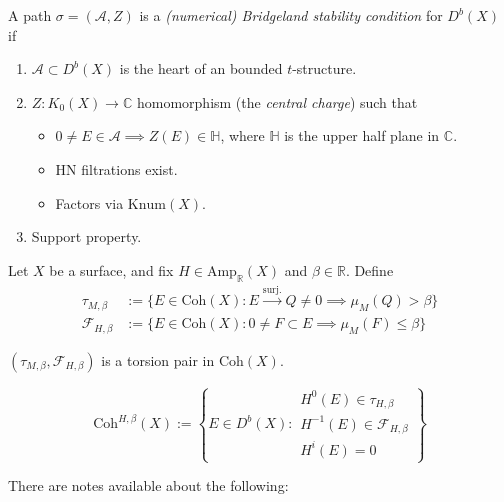 \begin{definition}
\label{definition-numerical-Bridgeland-stability-condition}
A path $\sigma=(\mathcal{A},Z)$ is a {\it (numerical) Bridgeland stability
condition} for $D^b(X)$ if
\begin{enumerate}
\item $\mathcal{A} \subset D^b(X)$ is the heart of an bounded $t$-structure.
\item $Z:K_0(X) \to \mathbb{C}$ homomorphism (the {\it central charge}) such
that
\begin{itemize}
\item $0 \neq E \in \mathcal{A} \implies  Z(E) \in \mathbb{H}$, where
$\mathbb{H}$ is the upper half plane in $\mathbb{C}$.
\item HN filtrations exist.
\item Factors via $\text{Knum}(X)$.
\end{itemize}
\item Support property.
\end{enumerate}
\end{definition}

Let $X$ be a surface, and fix  $H \in \text{Amp}_\mathbb{R}(X)$ and $\beta \in
\mathbb{R}$. Define
\begin{align*}
\tau_{M,\beta}&:=\{E \in \text{Coh}(X):E \overset{\text{surj.}}{\to} Q \neq 0 
\implies \mu_M(Q)>\beta\}\\
\mathcal{F}_{H,\beta}&:=\{E \in \text{Coh}(X):0 \neq  F \subset E
\implies \mu_M(F) \leq \beta\}
\end{align*}

\begin{exercise}
\label{exercise-torsion-pair}
$(\tau_{M,\beta},\mathcal{F}_{H,\beta})$ is a torsion pair in $\text{Coh}(X)$.
\end{exercise}

\begin{definition}
\label{definition-Coh-H-beta}
$$
\text{Coh}^{H,\beta}(X):=\left\{ E \in D^b(X):
\substack{H^0(E) \in \tau_{H,\beta} \\ 
H^{-1}(E) \in \mathcal{F}_{H,\beta}\\
H^i(E)=0} \right\} 
$$
\end{definition}

\begin{exercise}
\label{exercise-new-slope}

\end{exercise}

There are notes available about the following:

